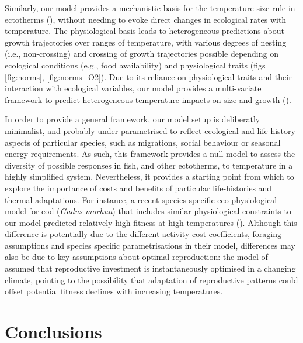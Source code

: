 \documentclass[11pt]{article}\usepackage[]{graphicx}\usepackage[]{color}
\begin{document}
Similarly, our model provides a mechanistic basis for the temperature-size rule in ectotherms (\cite{atkinson_temperature_1994}), without needing to evoke direct changes in ecological rates with temperature. The physiological basis leads to heterogeneous predictions about growth trajectories over ranges of temperature, with various degrees of nesting (i.e., non-crossing) and crossing of growth trajectories possible depending on ecological conditions (e.g., food availability) and physiological traits (figs \ref{fig:norms}, \ref{fig:norms_O2}). Due to its reliance on physiological traits and their interaction with ecological variables, our model provides a multi-variate framework to predict heterogeneous temperature impacts on size and growth (\cite{angilletta_temperature_2004}).

In order to provide a general framework, our model setup is deliberatly minimalist, and probably under-parametrised to reflect ecological and life-history aspects of particular species, such as migrations, social behaviour or seasonal energy requirements. As such, this framework provides a null model to assess the diversity of possible responses in fish, and other ectotherms, to temperature in a highly simplified system. Nevertheless, it provides a starting point from which to explore the importance of costs and benefits of particular life-histories and thermal adaptations. For instance, a recent species-specific eco-physiological model for cod (\emph{Gadus morhua}) that includes similar physiological constraints to our model predicted relatively high fitness at high temperatures (\cite{holt_climate_2014,holt_climate_2015}). Although this difference is potentially due to the different activity cost coefficients, foraging assumptions and species specific parametrisations in their model, differences may also be due to key assumptions about optimal reproduction: the model of  \textcite{holt_climate_2014} assumed that reproductive investment is instantaneously optimised in a changing climate, pointing to the possibility that adaptation of reproductive patterns could offset potential fitness declines with increasing temperatures.

\section*{Conclusions}
\end{document}
